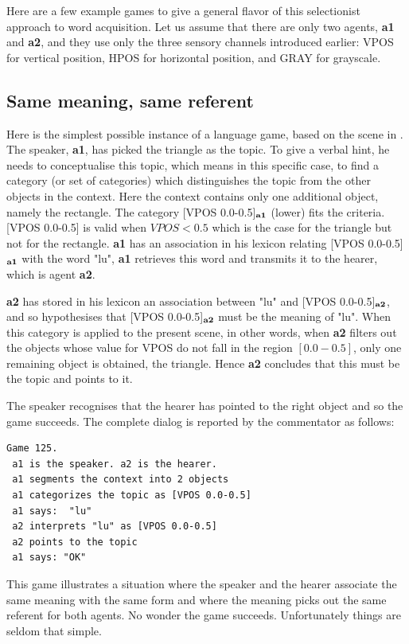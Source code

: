 Here are a few example games to give a general 
flavor of this selectionist approach to word acquisition. 
Let us assume that there are only two 
agents, {\bf a1} and {\bf a2}, and they use only the 
three sensory channels introduced earlier: VPOS for 
vertical position, HPOS for horizontal position, and GRAY
for grayscale. 

\subsection{Same meaning, same referent}

Here is the simplest possible instance of a
language game, based on the scene in . 
The speaker, {\bf a1}, has picked the triangle as the topic.
To give a verbal hint, he needs 
to conceptualise this topic, which means in this 
specific case, to find a 
category (or set of categories) which distinguishes the 
topic from the other objects in the context. Here 
the context contains only one additional 
object, namely the rectangle. The category
[VPOS 0.0-0.5]$_{\bf a1}$ (lower) fits the criteria. 
[VPOS 0.0-0.5] is valid when $VPOS < 0.5$
which is the case for the triangle but not for the rectangle. 
{\bf a1} has an association in his lexicon 
relating [VPOS 0.0-0.5]$_{\bf a1}$ with the word "lu", 
{\bf a1} retrieves this word and transmits it to 
the hearer, which is agent {\bf a2}. 

{\bf a2} has stored in his lexicon an
association between "lu" and [VPOS 0.0-0.5]$_{\bf a2}$, and so
hypothesises that [VPOS 0.0-0.5]$_{\bf a2}$ must be the meaning of "lu". 
When this category is applied to the present scene, in other words,
when {\bf a2} filters out the objects whose value for VPOS do not 
fall in the region $[0.0-0.5]$, only one 
remaining object is obtained, the triangle. Hence {\bf a2} concludes that 
this must be the topic and points to it. 

The speaker recognises that the hearer has pointed
to the right object and so the game succeeds. The complete
dialog is reported by the commentator as follows: 
\begin{verbatim}
Game 125.
 a1 is the speaker. a2 is the hearer. 
 a1 segments the context into 2 objects
 a1 categorizes the topic as [VPOS 0.0-0.5]
 a1 says:  "lu"
 a2 interprets "lu" as [VPOS 0.0-0.5]
 a2 points to the topic 
 a1 says: "OK" 
\end{verbatim}
This game illustrates a situation 
where the speaker and the hearer associate the same meaning
with the same form and where the meaning 
picks out the same referent for both agents. No wonder
the game succeeds. Unfortunately things are seldom that simple. 

